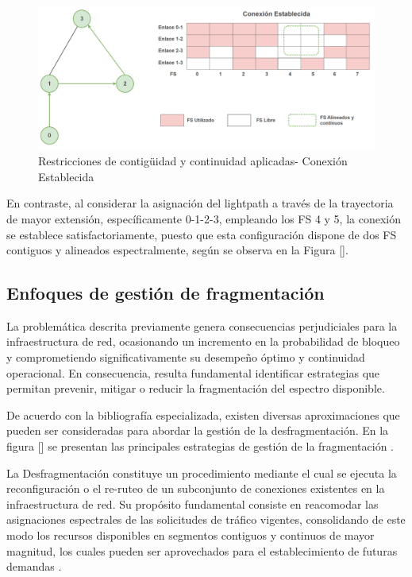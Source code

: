 \begin{figure}[H]
    \centering
    \includegraphics[width=1\textwidth]{capitulos/img/fragmentacion2Nuevo.png}
    \caption{Restricciones de contigüidad y continuidad aplicadas- Conexión Establecida}
    \label{fig:fragmentacion2Nueva}
\end{figure}

En contraste, al considerar la asignación del lightpath a través de la trayectoria de mayor extensión, específicamente 0-1-2-3, empleando los FS 4 y 5, la conexión se establece satisfactoriamente, puesto que esta configuración dispone de dos FS contiguos y alineados espectralmente, según se observa en la Figura [].
%

\subsection{Enfoques de gestión de fragmentación}
La problemática descrita previamente genera consecuencias perjudiciales para la infraestructura de red, ocasionando un incremento en la probabilidad de bloqueo y comprometiendo significativamente su desempeño óptimo y continuidad operacional. En consecuencia, resulta fundamental identificar estrategias que permitan prevenir, mitigar o reducir la fragmentación del espectro disponible.
%

De acuerdo con la bibliografía especializada, existen diversas aproximaciones que pueden ser consideradas para abordar la gestión de la desfragmentación. En la figura [] se presentan las principales estrategias de gestión de la fragmentación \cite{chatterjee2017fragmentation}.
%


La Desfragmentación constituye un procedimiento mediante el cual se ejecuta la reconfiguración o el re-ruteo de un subconjunto de conexiones existentes en la infraestructura de red. Su propósito fundamental consiste en reacomodar las asignaciones espectrales de las solicitudes de tráfico vigentes, consolidando de este modo los recursos disponibles en segmentos contiguos y continuos de mayor magnitud, los cuales pueden ser aprovechados para el establecimiento de futuras demandas \cite{talebi2014spectrum}.
%

